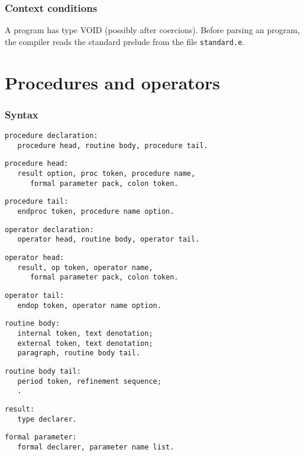 \documentclass [a4paper,12pt,fleqn]{article}
\begin{document}
\subsubsection*{Context conditions}
A program has type VOID (possibly after coercions).
Before parsing an \ELAN program, the \ELAN compiler reads the
standard prelude from the file \verb+standard.e+.
\section{Procedures and operators}
\subsubsection*{Syntax}
\begin{letterlist}
\item
\begin{verbatim}
procedure declaration:
   procedure head, routine body, procedure tail.
\end{verbatim}
\item
\begin{verbatim}
procedure head:
   result option, proc token, procedure name,
      formal parameter pack, colon token.
\end{verbatim}
\item
\begin{verbatim}
procedure tail:
   endproc token, procedure name option.
\end{verbatim}
\item
\begin{verbatim}
operator declaration:
   operator head, routine body, operator tail.
\end{verbatim}
\item
\begin{verbatim}
operator head:
   result, op token, operator name,
      formal parameter pack, colon token.
\end{verbatim}
\item
\begin{verbatim}
operator tail:
   endop token, operator name option.
\end{verbatim}
\item
\begin{verbatim}
routine body:
   internal token, text denotation;
   external token, text denotation;
   paragraph, routine body tail.
\end{verbatim}
\item
\begin{verbatim}
routine body tail:
   period token, refinement sequence;
   .
\end{verbatim}
\item
\begin{verbatim}
result:
   type declarer.
\end{verbatim}
\item
\begin{verbatim}
formal parameter:
   formal declarer, parameter name list.
\end{verbatim}
\end{letterlist}
\end{document}
